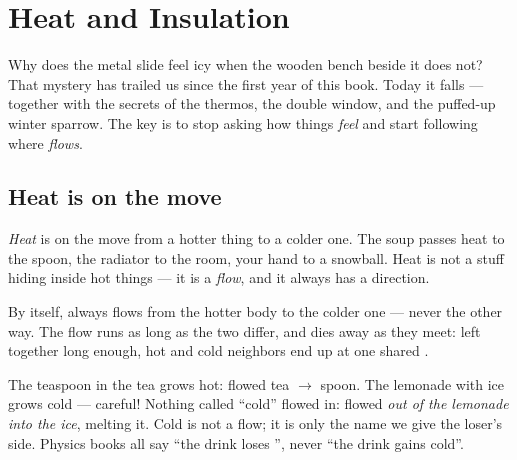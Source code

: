 \chapter{Heat and Insulation}\label{ch:g5:heat-and-insulation}

Why does the metal slide feel icy when the wooden bench beside it
does not? That mystery has trailed us since the first year of this
book. Today it falls --- together with the secrets of the thermos,
the double window, and the puffed-up winter sparrow. The key is to
stop asking how things \emph{feel} and start following where 
\emph{flows}.

\section{Heat is on the move}

\begin{definition}[Heat]\label{def:g5:heat-and-insulation:heat}
\emph{Heat} is  on the move from a hotter thing
to a colder one. The soup passes heat to the spoon, the radiator to
the room, your hand to a snowball. Heat is not a stuff hiding
inside hot things --- it is a \emph{flow}, and it always has a
direction.
\end{definition}

\begin{proposition}\label{prop:g5:heat-and-insulation:downhill}
By itself,  always flows from the hotter body to the colder
one --- never the other way. The flow runs as long as the two
 differ, and dies away as they meet: left together
long enough, hot and cold neighbors end up at one shared
.
\end{proposition}

\begin{example}\label{ex:g5:heat-and-insulation:direction}
The teaspoon in the tea grows hot:  flowed tea $\to$ spoon.
The lemonade with ice grows cold --- careful! Nothing called
``cold'' flowed in:  flowed \emph{out of the lemonade into the
ice}, melting it. Cold is not a flow; it is only the name we give
the loser's side. Physics books all say ``the drink loses '',
never ``the drink gains cold''.
\end{example}


